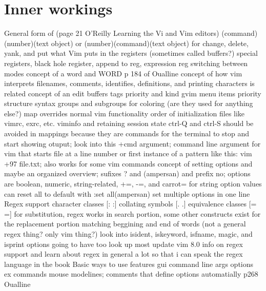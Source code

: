 \documentclass[12pt]{book}
\begin{document}
\section{Inner workings}
General form of (page 21 O'Reilly Learning the Vi and Vim editors) (command)(number)(text object) or (number)(command)(text object) for change, delete, yank, and put
what Vim puts in the registers (sometimes called buffers?) special registers, black hole register, append to reg, expression reg
switching between modes
concept of a word and WORD p 184 of Oualline
  concept of how vim interprets filenames, comments, identifies, definitions, and printing characters is related
concept of an edit
buffers
tags priority and kind
gvim menu items priority structure
syntax groups and subgroups for coloring (are they used for anything else?)
map overrides normal vim functionality
order of initialization files like vimrc, exrc, etc.
viminfo and retaining session state
ctrl-Q and ctrl-S should be avoided in mappings because they are commands for the terminal to stop and start showing otuput; look into this
+cmd argument; command line argument for vim that starts file at a line number or first instance of a pattern like this: vim +97 file.txt; also works for some vim commands
concept of setting options and maybe an organized overview; sufixes ? and (ampersan) and prefix no;
  options are boolean, numeric, string-related,
    +=, -=, and carrot= for string option values
    can reset all to default with :set all(ampersan)
    set multiple options in one line
Regex support
  character classes [: :]
  collating symbols [. .]
  equivalence classes [= =]
  for substitution, regex works in search portion, some other constructs exist for the replacement portion
  matching beggining and end of words (not a general regex thing? only vim thing?)
  look into isident, iskeyword, isfname, magic, and isprint options
  going to have too look up most update vim 8.0 info on regex support and learn about regex in general a lot so that i can speak the regex language in the book
Basic ways to use features
  gui
  command line args
  options
  ex commands
  mouse
	modelines; comments that define options automatially p268 Oualline
\end{document}
